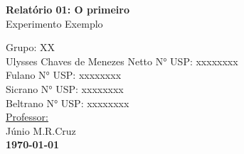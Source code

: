 \documentclass{article}
\begin{document}
\begin{titlepage}
\begin{center}
\begin{figure}[!ht]
			\end{figure}
					
			\vspace{200pt}
			
			\LARGE{\textbf{Relatório 01: O primeiro}}\\ %
			\Large{Experimento Exemplo}\\ %
			
			\vspace{150pt}
			
			\hfill Grupo: XX \\%
			
			\vspace{40pt} %
			\hfill Ulysses Chaves de Menezes Netto\hspace{20pt} N° USP: xxxxxxxx\\
		    \hfill Fulano \hspace{20pt} N° USP: xxxxxxxx\\
		    \hfill Sicrano \hspace{20pt} N° USP: xxxxxxxx\\
			\hfill Beltrano \hspace{20pt} N° USP: xxxxxxxx\\
			
			\vspace{25pt}
			\hfill \underline{Professor:}\\
			\hfill Júnio M.R.Cruz\\ %
			
			
			\vspace{\fill}
			\large\bf{\today}
			
		\end{center}
	\end{titlepage}
	
	
	\newpage
	
	\listoffigures %
	\newpage
	
	\pagestyle{fancy}
	\fancyhead[C]{}
	\fancyfoot[L]{}
	\fancyfoot[C]{\thepage}
	\fancyfoot[R]{}
	\renewcommand{\headrulewidth}{0.4pt}
	\renewcommand{\footrulewidth}{0.4pt}
	
\end{document}

